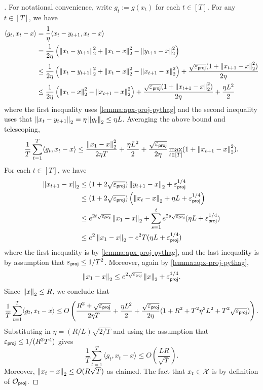 \begin{proof}[]
For notational convenience, write $g_t := g(x_t)$ for each $t \in [T]$. For any $t \in [T]$, we have
\begin{align}
\langle g_t, x_t - x\rangle
&= \frac{1}{\eta} \langle x_t - y_{t+1}, x_t - x \rangle \\ 
&= \frac{1}{2\eta} \left(\left \lVert x_t-y_{t+1} \right \rVert_2^2 + \left \lVert x_t - x \right \rVert_2^2 - \left \lVert y_{t+1}-x \right \rVert_2^2 \right) \\ 
&\leq \frac{1}{2\eta} \left(\left \lVert x_t-y_{t+1} \right \rVert_2^2 + \left \lVert x_t - x \right \rVert_2^2 - \left \lVert x_{t+1}-x \right \rVert_2^2 \right) + \frac{\sqrt{\varepsilon_{\mathsf{proj}}}(1+\left \lVert x_{t+1}-x \right \rVert_2^2)}{2\eta} \\ 
&\leq \frac{1}{2\eta} \left(\left \lVert x_t - x \right \rVert_2^2 - \left \lVert x_{t+1}-x \right \rVert_2^2 \right) + \frac{\sqrt{\varepsilon_{\mathsf{proj}}}(1+\left \lVert x_{t+1}-x \right \rVert_2^2)}{2\eta} + \frac{\eta L^2}{2}
\end{align}
where the first inequality uses \cref{lemma:apx-proj-pythag} and the second inequality uses that $\left \lVert x_t - y_{t+1} \right \rVert_2 = \eta\left \lVert g_t \right \rVert_2 \leq \eta L$. Averaging the above bound and telescoping,
\[\frac{1}{T}\sum_{t=1}^T \langle g_t,x_t - x\rangle \leq \frac{\left \lVert x_1 - x \right \rVert_2^2}{2\eta T} + \frac{\eta L^2 }{2} + \frac{\sqrt{\varepsilon_{\mathsf{proj}}}}{2\eta} \max_{t \in [T]} (1 + \left \lVert x_{t+1} - x \right \rVert_2^2).\]
For each $t \in [T]$, we have
\begin{align}
\left \lVert x_{t+1} - x \right \rVert_2
&\leq (1+2\sqrt{\varepsilon_{\mathsf{proj}}})\left \lVert y_{t+1}-x \right \rVert_2 + \varepsilon_{\mathsf{proj}}^{1/4} \\ 
&\leq (1+2\sqrt{\varepsilon_{\mathsf{proj}}})\left(\left \lVert x_t - x \right \rVert_2 + \eta L + \varepsilon_{\mathsf{proj}}^{1/4}\right) \\ 
&\leq e^{2t\sqrt{\varepsilon_{\mathsf{proj}}}} \left \lVert x_1-x \right \rVert_2 + \sum_{s=1}^t e^{2s\sqrt{\varepsilon_{\mathsf{proj}}}} (\eta L + \varepsilon_{\mathsf{proj}}^{1/4}) \\ 
&\leq e^2 \left \lVert x_1 - x \right \rVert_2 + e^2 T (\eta L + \varepsilon_{\mathsf{proj}}^{1/4})
\end{align}
where the first inequality is by \cref{lemma:apx-proj-pythag}, and the last inequality is by assumption that $\varepsilon_{\mathsf{proj}} \leq 1/T^2$. Moreover, again by \cref{lemma:apx-proj-pythag},
\[\left \lVert x_1 - x \right \rVert_2 \leq e^{2\sqrt{\varepsilon_{\mathsf{proj}}}} \left \lVert x \right \rVert_2 + \varepsilon_{\mathsf{proj}}^{1/4}.\]
Since $\left \lVert x \right \rVert_2 \leq R$, we conclude that
\[\frac{1}{T}\sum_{t=1}^T \langle g_t,x_t - x\rangle \leq O\left(\frac{R^2+\sqrt{\varepsilon_{\mathsf{proj}}}}{2\eta T} + \frac{\eta L^2 }{2} + \frac{\sqrt{\varepsilon_{\mathsf{proj}}}}{2\eta}(1 + R^2 + T^2\eta^2 L^2 + T^2\sqrt{\varepsilon_{\mathsf{proj}}})\right).\]
Substituting in $\eta = (R/L)\sqrt{2/T}$ and using the assumption that $\varepsilon_{\mathsf{proj}} \leq 1/(R^2 T^4)$ gives
\[\frac{1}{T}\sum_{t=1}^T \langle g_t,x_t - x\rangle \leq O\left(\frac{LR}{\sqrt{T}}\right).\]
Moreover, $\left \lVert x_t - x \right \rVert_2 \leq O(R \sqrt{T})$ as claimed. The fact that $x_t \in \mathcal{X}$ is by definition of $\mathcal{O}_{\mathsf{proj}}$.
\end{proof}


